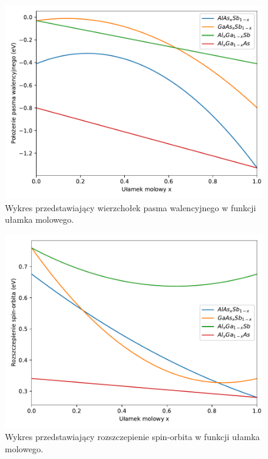 \documentclass[12pt,openany,a4paper]{book}
\begin{document}
\begin{figure}[H]
	\centering
	\includegraphics[width = 0.9\linewidth]{Figures/ternary/vbo.pdf}
	\caption{Wykres przedstawiający wierzchołek pasma walencyjnego w funkcji ułamka 
	molowego.}\label{fig:ter_vbo}
\end{figure}

\begin{figure}[H]
	\centering
	\includegraphics[width = 0.9\linewidth]{Figures/ternary/delta_so.pdf}
	\caption{Wykres przedstawiający rozszczepienie spin-orbita w funkcji ułamka 
	molowego.}\label{fig:ter_delta_so}
\end{figure}
\end{document}
